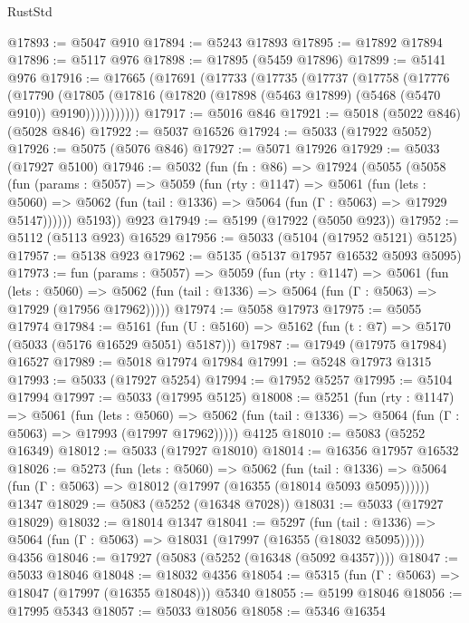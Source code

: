 \begin{lexlean}{RustStd}
\begin{coremodule}
@17893 := @5047 @910
@17894 := @5243 @17893
@17895 := @17892 @17894
@17896 := @5117 @976
@17898 := @17895 (@5459 @17896)
@17899 := @5141 @976
@17916 := @17665
    (@17691
      (@17733
        (@17735
          (@17737
            (@17758
              (@17776
                (@17790
                  (@17805
                    (@17816 (@17820 (@17898 (@5463 @17899) (@5468 (@5470 @910)) @9190)))))))))))
@17917 := @5016 @846
@17921 := @5018 (@5022 @846) (@5028 @846)
@17922 := @5037 @16526
@17924 := @5033 (@17922 @5052)
@17926 := @5075 (@5076 @846)
@17927 := @5071 @17926
@17929 := @5033 (@17927 @5100)
@17946 := @5032
    (fun (fn : @86) =>
    @17924
      (@5055
        (@5058
          (fun (params : @5057) =>
          @5059
            (fun (rty : @1147) =>
            @5061
              (fun (lets : @5060) =>
              @5062 (fun (tail : @1336) => @5064 (fun (Γ : @5063) => @17929 @5147))))))
        @5193))
    @923
@17949 := @5199 (@17922 (@5050 @923))
@17952 := @5112 (@5113 @923) @16529
@17956 := @5033 (@5104 (@17952 @5121) @5125)
@17957 := @5138 @923
@17962 := @5135 (@5137 @17957 @16532 @5093 @5095)
@17973 := fun (params : @5057) =>
  @5059
    (fun (rty : @1147) =>
    @5061
      (fun (lets : @5060) =>
      @5062 (fun (tail : @1336) => @5064 (fun (Γ : @5063) => @17929 (@17956 @17962)))))
@17974 := @5058 @17973
@17975 := @5055 @17974
@17984 := @5161
    (fun (U : @5160) => @5162 (fun (t : @7) => @5170 (@5033 (@5176 @16529 @5051) @5187)))
@17987 := @17949 (@17975 @17984) @16527
@17989 := @5018 @17974 @17984
@17991 := @5248 @17973 @1315
@17993 := @5033 (@17927 @5254)
@17994 := @17952 @5257
@17995 := @5104 @17994
@17997 := @5033 (@17995 @5125)
@18008 := @5251
    (fun (rty : @1147) =>
    @5061
      (fun (lets : @5060) =>
      @5062 (fun (tail : @1336) => @5064 (fun (Γ : @5063) => @17993 (@17997 @17962)))))
    @4125
@18010 := @5083 (@5252 @16349)
@18012 := @5033 (@17927 @18010)
@18014 := @16356 @17957 @16532
@18026 := @5273
    (fun (lets : @5060) =>
    @5062
      (fun (tail : @1336) =>
      @5064 (fun (Γ : @5063) => @18012 (@17997 (@16355 (@18014 @5093 @5095))))))
    @1347
@18029 := @5083 (@5252 (@16348 @7028))
@18031 := @5033 (@17927 @18029)
@18032 := @18014 @1347
@18041 := @5297
    (fun (tail : @1336) => @5064 (fun (Γ : @5063) => @18031 (@17997 (@16355 (@18032 @5095)))))
    @4356
@18046 := @17927 (@5083 (@5252 (@16348 (@5092 @4357))))
@18047 := @5033 @18046
@18048 := @18032 @4356
@18054 := @5315 (fun (Γ : @5063) => @18047 (@17997 (@16355 @18048))) @5340
@18055 := @5199 @18046
@18056 := @17995 @5343
@18057 := @5033 @18056
@18058 := @5346 @16354

\end{coremodule}
\end{lexlean}
